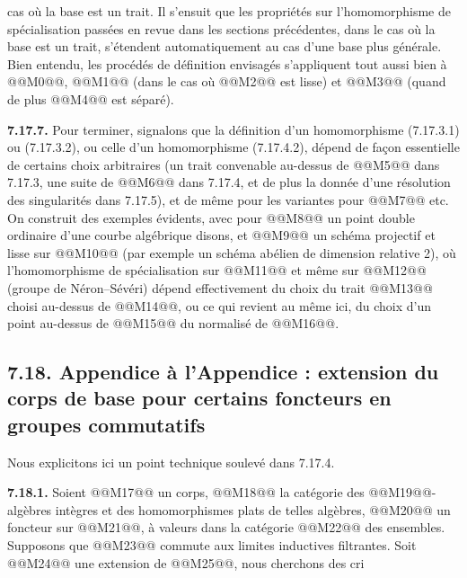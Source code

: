 
cas où la base est un trait. Il s'ensuit que les propriétés sur l'homomorphisme de spécialisation passées en revue dans les sections précédentes, dans le cas où la base est un trait, s'étendent automatiquement au cas d'une base plus générale. Bien entendu, les procédés de définition envisagés s'appliquent tout aussi bien à @@M0@@, @@M1@@ (dans le cas où @@M2@@ est lisse) et @@M3@@ (quand de plus @@M4@@ est séparé).

\textbf{7.17.7.} Pour terminer, signalons que la définition d'un homomorphisme (7.17.3.1) ou (7.17.3.2), ou celle d'un homomorphisme (7.17.4.2), dépend de façon essentielle de certains choix arbitraires (un trait convenable au-dessus de @@M5@@ dans 7.17.3, une suite de @@M6@@ dans 7.17.4, et de plus la donnée d'une résolution des singularités dans 7.17.5), et de même pour les variantes pour @@M7@@ etc. On construit des exemples évidents, avec pour @@M8@@ un point double ordinaire d'une courbe algébrique disons, et @@M9@@ un schéma projectif et lisse sur @@M10@@ (par exemple un schéma abélien de dimension relative 2), où l'homomorphisme de spécialisation sur @@M11@@ et même sur @@M12@@ (groupe de Néron--Sévéri) dépend effectivement du choix du trait @@M13@@ choisi au-dessus de @@M14@@, ou ce qui revient au même ici, du choix d'un point au-dessus de @@M15@@ du normalisé de @@M16@@.

\subsection*{7.18. Appendice à l'Appendice : extension du corps de base pour certains foncteurs en groupes commutatifs}
Nous explicitons ici un point technique soulevé dans 7.17.4.

\textbf{7.18.1.} Soient @@M17@@ un corps, @@M18@@ la catégorie des @@M19@@-algèbres intègres et des homomorphismes plats de telles algèbres, @@M20@@ un foncteur sur @@M21@@, à valeurs dans la catégorie @@M22@@ des ensembles. Supposons que @@M23@@ commute aux limites inductives filtrantes. Soit @@M24@@ une extension de @@M25@@, nous cherchons des cri%
